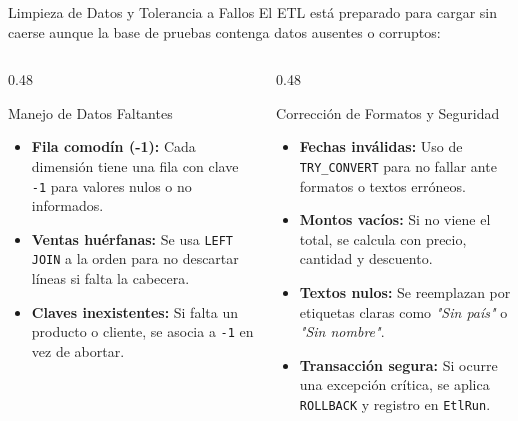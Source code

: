 \documentclass[aspectratio=169, 10pt]{beamer}
\begin{document}
\begin{frame}{Limpieza de Datos y Tolerancia a Fallos}
    El ETL está preparado para cargar sin caerse aunque la base de pruebas contenga datos ausentes o corruptos:
    
    \vspace{0.15cm}
    \begin{columns}[t]
        \begin{column}{0.48\textwidth}
            \begin{block}{Manejo de Datos Faltantes}
                \footnotesize
                \begin{itemize}\setlength{\itemsep}{1.5pt}
                    \item \textbf{Fila comodín (-1):} Cada dimensión tiene una fila con clave \texttt{-1} para valores nulos o no informados.
                    \item \textbf{Ventas huérfanas:} Se usa \texttt{LEFT JOIN} a la orden para no descartar líneas si falta la cabecera.
                    \item \textbf{Claves inexistentes:} Si falta un producto o cliente, se asocia a \texttt{-1} en vez de abortar.
                \end{itemize}
            \end{block}
        \end{column}
        
        \begin{column}{0.48\textwidth}
            \begin{block}{Corrección de Formatos y Seguridad}
                \footnotesize
                \begin{itemize}\setlength{\itemsep}{1.5pt}
                    \item \textbf{Fechas inválidas:} Uso de \texttt{TRY\_CONVERT} para no fallar ante formatos o textos erróneos.
                    \item \textbf{Montos vacíos:} Si no viene el total, se calcula con precio, cantidad y descuento.
                    \item \textbf{Textos nulos:} Se reemplazan por etiquetas claras como \textit{"Sin país"} o \textit{"Sin nombre"}.
                    \item \textbf{Transacción segura:} Si ocurre una excepción crítica, se aplica \texttt{ROLLBACK} y registro en \texttt{EtlRun}.
                \end{itemize}
            \end{block}
        \end{column}
    \end{columns}
\end{frame}
\end{document}

